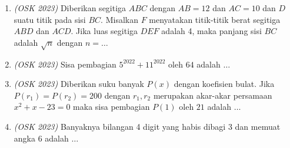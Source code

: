 \begin{enumerate}
	\item \textit{(OSK 2023)} Diberikan segitiga $ABC$ dengan $AB= 12$ dan $AC = 10$ dan $D$ suatu titik pada sisi $BC$. Misalkan $F$ menyatakan titik-titik berat segitiga $ABD$ dan $ACD$. Jika luas segitiga $DEF$ adalah 4, maka panjang sisi $BC$ adalah $\sqrt{n}$ dengan $n = \dots$ 
	
	\item \textit{(OSK 2023)} Sisa pembagian $5^{2022}+11^{2022}$ oleh $64$ adalah $\dots$
	
	\item \textit{(OSK 2023)} Diberikan suku banyak $P(x)$ dengan koefisien bulat. Jika $P(r_1)=P(r_2)=200$ dengan $r_1,r_2$ merupakan akar-akar persamaan $x^2+x-23=0$ maka sisa pembagian $P(1)$ oleh $21$ adalah $\dots$
	
	\item \textit{(OSK 2023)} Banyaknya bilangan 4 digit yang habis dibagi 3 dan memuat angka 6 adalah $\dots$ 
\end{enumerate}

